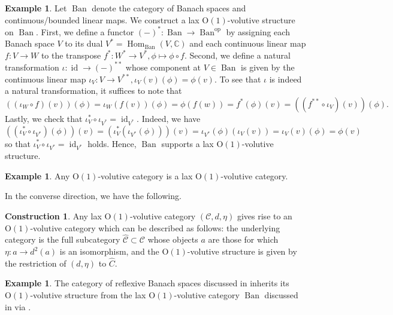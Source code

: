\documentclass{article}
\newcommand{\opp}{\operatorname{op}}%
\newcommand{\id}{\operatorname{id}}%
\newcommand{\Ban}{\operatorname{Ban}}%
\newcommand{\Hom}{\operatorname{Hom}}%
\newcommand{\Oone}{\operatorname{O(1)}}
\newcommand{\C}{\mathcal{C}}
\numberwithin{equation}{section}
\theoremstyle{definition}
\newtheorem{construction}[definition]{Construction}
\newtheorem{example}[definition]{Example}
\theoremstyle{theorem}
\begin{document}
\begin{example}\label{Example: Banach spaces are lax volutive}
    Let $\Ban$ denote the category of Banach spaces and continuous/bounded linear maps. We construct a lax $\Oone$-volutive structure on $\Ban$. First, we define 
    a functor $(-)^* \colon \Ban \to \Ban^{\opp}$ by assigning each Banach space $V$ to its dual $V^* = \Hom_{\Ban}(V,\mathbb{C})$ and each continuous linear map 
    $f \colon V \to W$ to the transpose $f^* \colon W^* \to V^*, \phi \mapsto \phi \circ f$. Second, we define a natural transformation $\iota \colon \id \to (-)^{**}$ 
    whose component at $V \in \Ban$ is given by the continuous linear map $\iota_V \colon V \to V^{**}, \iota_V(v)(\phi) = \phi(v)$. To see that $\iota$ is indeed 
    a natural transformation, it suffices to note that 
    \begin{equation}
        ((\iota_W \circ f)(v))(\phi) = \iota_W(f(v))(\phi) = \phi(f(w)) = f^*(\phi)(v) = ((f^{**} \circ \iota_V)(v))(\phi).
    \end{equation}
    Lastly, we check that $\iota_V^* \circ \iota_{V^*} = \id_{V^*}$. Indeed, we have 
    \begin{equation}
        ((\iota_V^* \circ \iota_{V^*})(\phi))(v) = (\iota_V^*(\iota_{V^*}(\phi)))(v) = \iota_{V^*}(\phi)(\iota_V(v)) = \iota_V(v)(\phi) = \phi(v)
    \end{equation}
    so that $\iota_V^* \circ \iota_{V^*} = \id_{V^*}$ holds. Hence, $\Ban$ supports a lax $\Oone$-volutive structure.
\end{example}
\begin{example}
    Any $\Oone$-volutive category is a lax $\Oone$-volutive category. 
\end{example}
In the converse direction, we have the following.
\begin{construction}\label{Construction: Oone volutions from lax Oone volutions}
    Any lax $\Oone$-volutive category $(\C,d,\eta)$ gives rise to an $\Oone$-volutive category which can be described as follows: 
    the underlying category is the full subcategory $\hat{\C} \subset \C$ whose objects $a$ are those for which 
    $\eta \colon a \to d^2(a)$ is an isomorphism, and the $\Oone$-volutive structure is given by the restriction of $(d,\eta)$ to $\hat{C}$.
\end{construction}
\begin{example}
    The category of reflexive Banach spaces discussed in  inherits its $\Oone$-volutive structure 
    from the lax $\Oone$-volutive category $\Ban$ discussed in  via .
\end{example}
\end{document}
